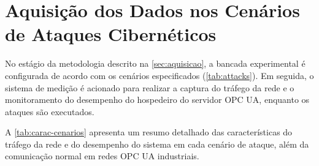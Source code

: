 \section{Aquisição dos Dados nos Cenários de Ataques Cibernéticos} \label{sec:exec-attacks}

    No estágio da metodologia descrito na \autoref{sec:aquisicao}, a bancada experimental é configurada de acordo com os cenários especificados (\autoref{tab:attacks}). Em seguida, o sistema de medição é acionado para realizar a captura do tráfego da rede e o monitoramento do desempenho do hospedeiro do servidor OPC UA, enquanto os ataques são executados.
    
    A \autoref{tab:carac-cenarios} apresenta um resumo detalhado das características do tráfego da rede e do desempenho do sistema em cada cenário de ataque, além da comunicação normal em redes OPC UA industriais.

